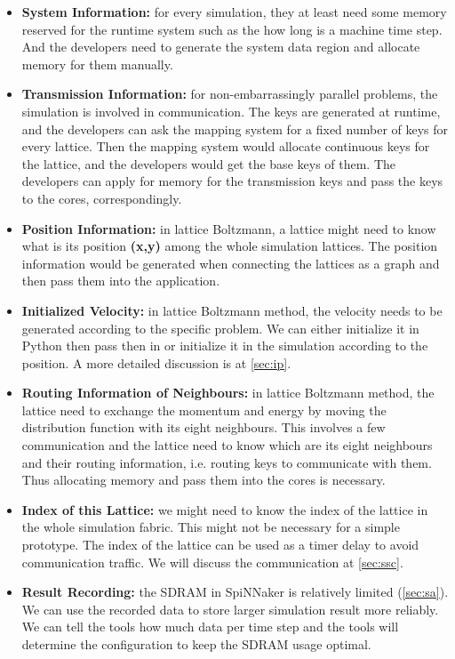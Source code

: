 \begin{itemize}
    \item \textbf{System Information:} for every simulation, they at least need some memory reserved for the runtime system such as the how long is a machine time step. And the developers need to generate the system data region and allocate memory for them manually.
    
    \item \textbf{Transmission Information:} for non-embarrassingly parallel problems, the simulation is involved in communication. The keys are generated at runtime, and the developers can ask the mapping system for a fixed number of keys for every lattice. Then the mapping system would allocate continuous keys for the lattice, and the developers would get the base keys of them. The developers can apply for memory for the transmission keys and pass the keys to the cores, correspondingly.

    \item \textbf{Position Information:} in lattice Boltzmann, a lattice might need to know what is its position \textbf{(x,y)} among the whole simulation lattices. The position information would be generated when connecting the lattices as a graph and then pass them into the application.
    
    \item \textbf{Initialized Velocity:} in lattice Boltzmann method, the velocity needs to be generated according to the specific problem. We can either initialize it in Python then pass then in or initialize it in the simulation according to the position. A more detailed discussion is at \ref{sec:ip}.
    
    \item \textbf{Routing Information of Neighbours:} in lattice Boltzmann method, the lattice need to exchange the momentum and energy by moving the distribution function with its eight neighbours. This involves a few communication and the lattice need to know which are its eight neighbours and their routing information, i.e. routing keys to communicate with them. Thus allocating memory and pass them into the cores is necessary. 
    
    \item \textbf{Index of this Lattice:} we might need to know the index of the lattice in the whole simulation fabric. This might not be necessary for a simple prototype. The index of the lattice can be used as a timer delay to avoid communication traffic. We will discuss the communication at \ref{sec:ssc}.
    
    \item \textbf{Result Recording:} the SDRAM in SpiNNaker is relatively limited (\ref{sec:sa}). We can use the recorded data to store larger simulation result more reliably. We can tell the tools how much data per time step and the tools will determine the configuration to keep the SDRAM usage optimal.
\end{itemize}

